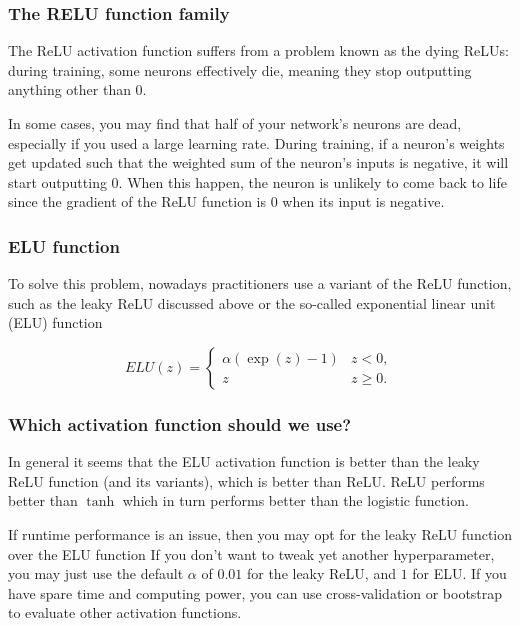 \documentclass{beamer}
\begin{document}
\begin{frame}
\frametitle{The RELU function family}

The ReLU activation function suffers from a problem known as the dying
ReLUs: during training, some neurons effectively die, meaning they
stop outputting anything other than 0.

In some cases, you may find that half of your network’s neurons are
dead, especially if you used a large learning rate. During training,
if a neuron’s weights get updated such that the weighted sum of the
neuron’s inputs is negative, it will start outputting 0. When this
happen, the neuron is unlikely to come back to life since the gradient
of the ReLU function is 0 when its input is negative.
\end{frame}

\begin{frame}
\frametitle{ELU function}

To solve this problem, nowadays practitioners use a variant of the
ReLU function, such as the leaky ReLU discussed above or the so-called
exponential linear unit (ELU) function

\[
ELU(z) = \left\{\begin{array}{cc} \alpha\left( \exp{(z)}-1\right) & z < 0,\\  z & z \ge 0.\end{array}\right. 
\]
\end{frame}

\begin{frame}
\frametitle{Which activation function should we use?}

In general it seems that the ELU activation function is better than
the leaky ReLU function (and its variants), which is better than
ReLU. ReLU performs better than $\tanh$ which in turn performs better
than the logistic function.

If runtime performance is an issue, then you may opt for the leaky
ReLU function over the ELU function If you don’t want to tweak yet
another hyperparameter, you may just use the default $\alpha$ of
$0.01$ for the leaky ReLU, and $1$ for ELU. If you have spare time and
computing power, you can use cross-validation or bootstrap to evaluate
other activation functions.
\end{frame}
\end{document}

